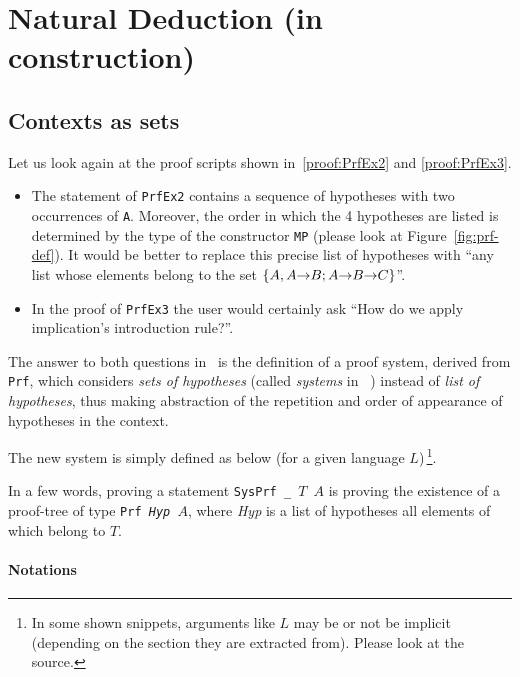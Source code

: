\chapter{Natural Deduction (in construction)}


\section{Contexts as sets}

Let us look again at the proof scripts shown in~\vref{proof:PrfEx2} and \vref{proof:PrfEx3}.
\begin{itemize}
\item The statement of \texttt{PrfEx2} contains a sequence
of hypotheses with two occurrences of \texttt{A}. Moreover, the order in which the 4 hypotheses are listed is determined by the type of the constructor \texttt{MP}  (please look at
Figure~\vref{fig:prf-def}). It would be better to replace this
precise list of hypotheses with ``any list whose elements
belong to the set $\{A, A \mbox{$\rightarrow$} B; A \mbox{$\rightarrow$} B \mbox{$\rightarrow$} C\}$''.

\item In the proof of \texttt{PrfEx3} the \coq user would certainly ask ``How do we apply implication's introduction rule?''.
\end{itemize}

The answer to both questions in~\cite{Goedel}  is the definition of a proof system, derived from \texttt{Prf}, which considers
\emph{sets of hypotheses} (called \emph{systems} in ~\cite{Goedel}) instead of
\emph{list of hypotheses}, thus making abstraction of
the repetition and order of appearance of hypotheses in the context.

The new system is simply defined as below (for  a given language $L$)\,\footnote{In some shown snippets, arguments like $L$ may be or not be implicit (depending on the section they are extracted from). Please look at the \coq source.}.



In a few words, proving a statement \texttt{SysPrf \_ $T$ $A$} 
is proving the existence of a proof-tree of type \texttt{Prf \textit{Hyp}  $A$}, where \textit{Hyp} is a list of hypotheses all elements of which belong to $T$.


\subsubsection{Notations}

